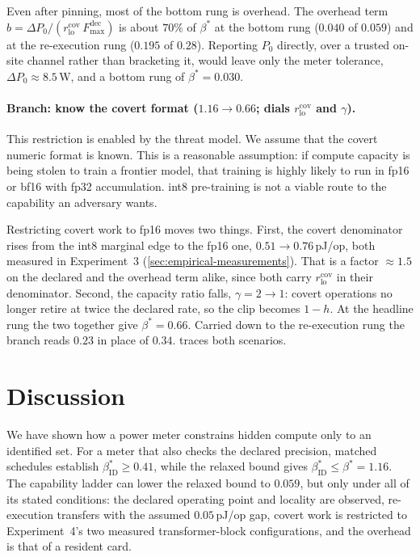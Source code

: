 \documentclass{article}
\theoremstyle{plain}
\theoremstyle{definition}
\theoremstyle{remark}
\begin{document}
Even after pinning, most of the bottom rung is overhead. The overhead term
$b = \Delta P_0/(r_{\mathrm{lo}}^{\mathrm{cov}}\,F_{\max}^{\mathrm{dec}})$ is
about $70\%$ of $\beta^{*}$ at the bottom rung ($0.040$ of $0.059$) and at the
re-execution rung ($0.195$ of $0.28$). Reporting $P_0$ directly, over a trusted
on-site channel rather than bracketing it, would leave only the meter tolerance,
$\Delta P_0 \approx 8.5$\,W, and a bottom rung of $\beta^{*}=0.030$.

\paragraph{Branch: know the covert format ($1.16 \to 0.66$; dials $r_{\mathrm{lo}}^{\mathrm{cov}}$ and $\gamma$).}

This restriction is enabled by the threat model. We assume that the covert numeric format
is known. This is a reasonable assumption:  if compute capacity is being stolen to train a frontier model, that training is highly likely to run in fp16 or bf16 with fp32 accumulation. int8 pre-training is not a viable route to the capability
an adversary wants.

Restricting covert work to fp16 moves two things. First, the covert
denominator rises from the int8 marginal edge to the fp16 one,
$0.51 \to 0.76$\,pJ/op, both measured in Experiment~3
(\cref{sec:empirical-measurements}). That is a factor ${\approx}1.5$ on the declared and
the overhead term alike, since both carry $r_{\mathrm{lo}}^{\mathrm{cov}}$ in
their denominator. Second, the capacity ratio falls, $\gamma = 2 \to 1$: covert
operations no longer retire at twice the declared rate, so the clip becomes
$1-h$. At the headline rung the two together give $\beta^{*} = 0.66$. Carried down to the re-execution rung the branch reads $0.23$ in
place of $0.34$.  traces both scenarios.


\section{Discussion}
\label{sec:discussion}
We have shown how a power meter constrains hidden compute only to an identified
set. For a meter that also checks the declared precision, matched schedules
establish $\beta_{\mathrm{ID}}^{*} \geq 0.41$, while the relaxed bound
gives $\beta_{\mathrm{ID}}^{*} \leq \beta^{*} = 1.16$. The capability ladder
can lower the relaxed bound to $0.059$, but only under all of its stated
conditions: the declared operating point and locality are observed,
re-execution transfers with the assumed $0.05$\,pJ/op gap, covert work is
restricted to Experiment~4's two measured transformer-block configurations,
and the overhead is that of a resident card.
\end{document}

